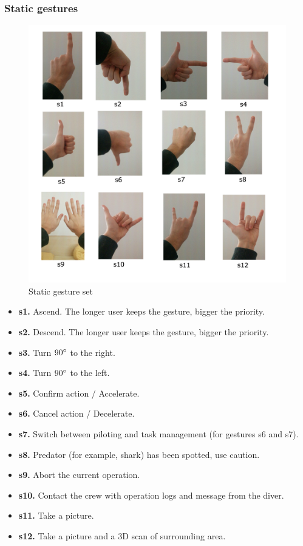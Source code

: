 \documentclass[a4paper,11pt,oneside]{article}
\begin{document}
    \subsubsection{Static gestures}

  \begin{figure}[H]
  \centering
  \includegraphics[scale=0.4]{static-gestureset.png}
  \caption{Static gesture set}
  \end{figure}
    
    \begin{itemize}
    \item \textbf{s1.} Ascend. The longer user keeps the gesture, bigger the priority.
    \item \textbf{s2.} Descend. The longer user keeps the gesture, bigger the priority.
    \item \textbf{s3.} Turn $90\degree$ to the right.
    \item \textbf{s4.} Turn $90\degree$ to the left.
    \item \textbf{s5.} Confirm action / Accelerate.
    \item \textbf{s6.} Cancel action / Decelerate.
    \item \textbf{s7.} Switch between piloting and task management (for gestures s6 and s7).
    \item \textbf{s8.} Predator (for example, shark) has been spotted, use caution.
    \item \textbf{s9.} Abort the current operation.
    \item \textbf{s10.} Contact the crew with operation logs and message from the diver.
    \item \textbf{s11.} Take a picture.
    \item \textbf{s12.} Take a picture and a 3D scan of surrounding area.
    \end{itemize}
    
\end{document}
